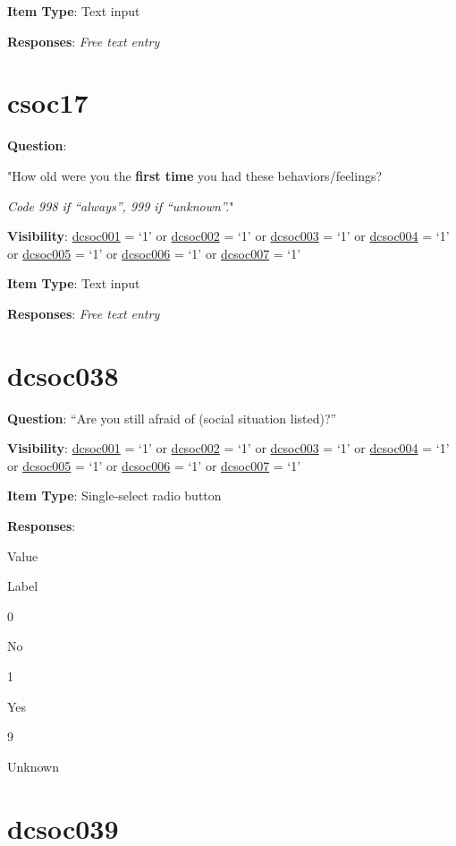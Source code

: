\documentclass[]{book}
\begin{document}
\textbf{Item Type}: Text input

\textbf{Responses}: \emph{Free text entry}

\hypertarget{csoc17}{%
\section{csoc17}\label{csoc17}}

\textbf{Question}:

"How old were you the \textbf{first time} you had these behaviors/feelings?

\emph{Code 998 if ``always'', 999 if ``unknown''.}"

\textbf{Visibility}: \protect\hyperlink{dcsoc001}{dcsoc001} = `1' or \protect\hyperlink{dcsoc002}{dcsoc002} = `1' or \protect\hyperlink{dcsoc003}{dcsoc003} = `1' or \protect\hyperlink{dcsoc004}{dcsoc004} = `1' or \protect\hyperlink{dcsoc005}{dcsoc005} = `1' or \protect\hyperlink{dcsoc006}{dcsoc006} = `1' or \protect\hyperlink{dcsoc007}{dcsoc007} = `1'

\textbf{Item Type}: Text input

\textbf{Responses}: \emph{Free text entry}

\hypertarget{dcsoc038}{%
\section{dcsoc038}\label{dcsoc038}}

\textbf{Question}: ``Are you still afraid of (social situation listed)?''

\textbf{Visibility}: \protect\hyperlink{dcsoc001}{dcsoc001} = `1' or \protect\hyperlink{dcsoc002}{dcsoc002} = `1' or \protect\hyperlink{dcsoc003}{dcsoc003} = `1' or \protect\hyperlink{dcsoc004}{dcsoc004} = `1' or \protect\hyperlink{dcsoc005}{dcsoc005} = `1' or \protect\hyperlink{dcsoc006}{dcsoc006} = `1' or \protect\hyperlink{dcsoc007}{dcsoc007} = `1'

\textbf{Item Type}: Single-select radio button

\textbf{Responses}:

Value

Label

0

No

1

Yes

9

Unknown

\hypertarget{dcsoc039}{%
\section{dcsoc039}\label{dcsoc039}}
\end{document}
